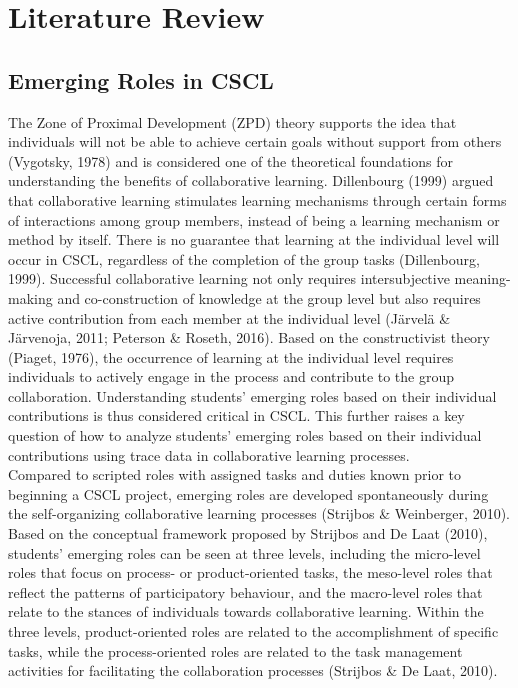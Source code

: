 \section{Literature Review}
\subsection{Emerging Roles in CSCL}
The Zone of Proximal Development (ZPD) theory supports the idea that individuals will not be able to achieve certain goals without support from others (Vygotsky, 1978) and is considered one of the theoretical foundations for understanding the benefits of collaborative learning. Dillenbourg (1999) argued that collaborative learning stimulates learning mechanisms through certain forms of interactions among group members, instead of being a learning mechanism or method by itself. There is no guarantee that learning at the individual level will occur in CSCL, regardless of the completion of the group tasks (Dillenbourg, 1999). Successful collaborative learning not only requires intersubjective meaning-making and co-construction of knowledge at the group level but also requires active contribution from each member at the individual level (Järvelä \& Järvenoja, 2011; Peterson \& Roseth, 2016). Based on the constructivist theory (Piaget, 1976), the occurrence of learning at the individual level requires individuals to actively engage in the process and contribute to the group collaboration. Understanding students’ emerging roles based on their individual contributions is thus considered critical in CSCL. This further raises a key question of how to analyze students’ emerging roles based on their individual contributions using trace data in collaborative learning processes.\\

Compared to scripted roles with assigned tasks and duties known prior to beginning a CSCL project, emerging roles are developed spontaneously during the self-organizing collaborative learning processes (Strijbos \& Weinberger, 2010). Based on the conceptual framework proposed by Strijbos and De Laat (2010), students’ emerging roles can be seen at three levels, including the micro-level roles that focus on process- or product-oriented tasks, the meso-level roles that reflect the patterns of participatory behaviour, and the macro-level roles that relate to the stances of individuals towards collaborative learning. Within the three levels, product-oriented roles are related to the accomplishment of specific tasks, while the process-oriented roles are related to the task management activities for facilitating the collaboration processes (Strijbos \& De Laat, 2010).\\

